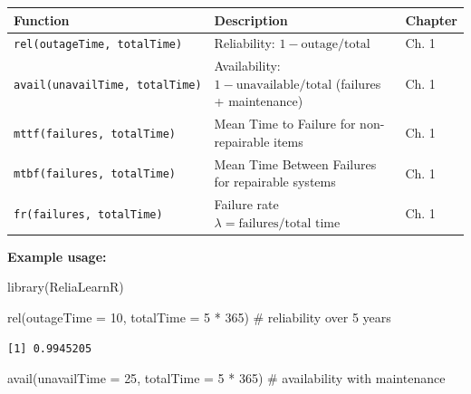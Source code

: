 \documentclass[
  letterpaper,
  DIV=11,
  numbers=noendperiod]{scrreprt}
\newenvironment{Shaded}{\begin{snugshade}}{\end{snugshade}}
\newcommand{\AttributeTok}[1]{\textcolor[rgb]{0.40,0.45,0.13}{#1}}
\newcommand{\CommentTok}[1]{\textcolor[rgb]{0.37,0.37,0.37}{#1}}
\newcommand{\DecValTok}[1]{\textcolor[rgb]{0.68,0.00,0.00}{#1}}
\newcommand{\FunctionTok}[1]{\textcolor[rgb]{0.28,0.35,0.67}{#1}}
\newcommand{\NormalTok}[1]{\textcolor[rgb]{0.00,0.23,0.31}{#1}}
\newcommand{\SpecialCharTok}[1]{\textcolor[rgb]{0.37,0.37,0.37}{#1}}
\newcounter{none} %
\begin{document}
{\def\LTcaptype{none} %
\begin{longtable}[]{@{}
  >{\raggedright\arraybackslash}p{}
  >{\raggedright\arraybackslash}p{}
  >{\raggedright\arraybackslash}p{}@{}}
\toprule\noalign{}
\begin{minipage}[b]{\linewidth}\raggedright
Function
\end{minipage} & \begin{minipage}[b]{\linewidth}\raggedright
Description
\end{minipage} & \begin{minipage}[b]{\linewidth}\raggedright
Chapter
\end{minipage} \\
\midrule\noalign{}
\endhead
\bottomrule\noalign{}
\endlastfoot
\texttt{rel(outageTime,\ totalTime)} & Reliability:
\(1 - \text{outage} / \text{total}\) & Ch. 1 \\
\texttt{avail(unavailTime,\ totalTime)} & Availability:
\(1 - \text{unavailable} / \text{total}\) (failures + maintenance) & Ch.
1 \\
\texttt{mttf(failures,\ totalTime)} & Mean Time to Failure for
non-repairable items & Ch. 1 \\
\texttt{mtbf(failures,\ totalTime)} & Mean Time Between Failures for
repairable systems & Ch. 1 \\
\texttt{fr(failures,\ totalTime)} & Failure rate
\(\lambda = \text{failures} / \text{total time}\) & Ch. 1 \\
\end{longtable}
}

\textbf{Example usage:}

\begin{Shaded}
\begin{Highlighting}[]
\FunctionTok{library}\NormalTok{(ReliaLearnR)}

\FunctionTok{rel}\NormalTok{(}\AttributeTok{outageTime =} \DecValTok{10}\NormalTok{, }\AttributeTok{totalTime =} \DecValTok{5} \SpecialCharTok{*} \DecValTok{365}\NormalTok{)   }\CommentTok{\# reliability over 5 years}
\end{Highlighting}
\end{Shaded}

\begin{verbatim}
[1] 0.9945205
\end{verbatim}

\begin{Shaded}
\begin{Highlighting}[]
\FunctionTok{avail}\NormalTok{(}\AttributeTok{unavailTime =} \DecValTok{25}\NormalTok{, }\AttributeTok{totalTime =} \DecValTok{5} \SpecialCharTok{*} \DecValTok{365}\NormalTok{) }\CommentTok{\# availability with maintenance}
\end{Highlighting}
\end{Shaded}
\end{document}
